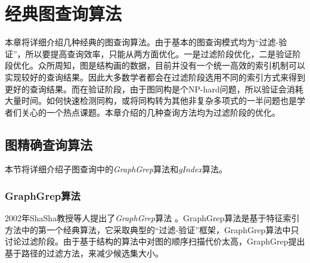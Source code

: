 \documentclass{XDBAthesis}
\begin{document}
\def\pictures{}
\else
\fi
\chapter{经典图查询算法}
\label{chap:classic}
本章将详细介绍几种经典的图查询算法。由于基本的图查询模式均为“过滤-验证”，所以要提高查询效率，只能从两方面优化。一是过滤阶段优化，二是验证阶段优化。众所周知，图是结构画的数据，目前并没有一个统一高效的索引机制可以实现较好的查询结果。因此大多数学者都会在过滤阶段选用不同的索引方式来得到更好的查询结果。而在验证阶段，由于图同构是个NP-hard问题，所以验证会消耗大量时间。如何快速检测同构，或将同构转为其他非复杂多项式的一半问题也是学者们关心的一个热点课题。本章介绍的几种查询方法均为过滤阶段的优化。
\section{图精确查询算法}
本节将详细介绍子图查询中的\emph{GraphGrep}算法\cite{graphgrep}和\emph{gIndex}算法\cite{gIndex}。
\subsection{GraphGrep算法}
2002年ShaSha教授等人提出了\emph{GraphGrep}算法\cite{graphgrep} 。GraphGrep算法是基于特征索引方法中的第一个经典算法，它采取典型的“过滤-验证”框架，GraphGrep算法中只讨论过滤阶段。由于基于结构的算法中对图的顺序扫描代价太高，GraphGrep提出基于路径的过滤方法，来减少候选集大小。
\end{document}
